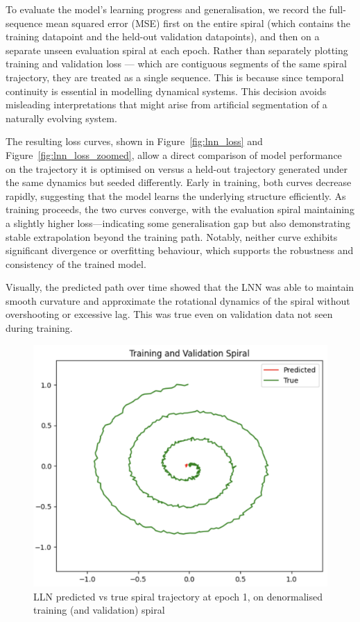To evaluate the model's learning progress and generalisation, we record the full-sequence mean squared error (MSE) first on the entire spiral (which contains the training datapoint and the held-out validation datapoints), and then on a separate unseen evaluation spiral at each epoch. Rather than separately plotting training and validation loss — which are contiguous segments of the same spiral trajectory, they are treated as a single sequence. This is because since temporal continuity is essential in modelling dynamical systems. This decision avoids misleading interpretations that might arise from artificial segmentation of a naturally evolving system.

The resulting loss curves, shown in Figure~\ref{fig:lnn_loss} and Figure~\ref{fig:lnn_loss_zoomed}, allow a direct comparison of model performance on the trajectory it is optimised on versus a held-out trajectory generated under the same dynamics but seeded differently. Early in training, both curves decrease rapidly, suggesting that the model learns the underlying structure efficiently. As training proceeds, the two curves converge, with the evaluation spiral maintaining a slightly higher loss—indicating some generalisation gap but also demonstrating stable extrapolation beyond the training path. Notably, neither curve exhibits significant divergence or overfitting behaviour, which supports the robustness and consistency of the trained model.

Visually, the predicted path over time showed that the LNN was able to maintain smooth curvature and approximate the rotational dynamics of the spiral without overshooting or excessive lag. This was true even on validation data not seen during training. 

\begin{figure}[H]
    \centering
    \includegraphics[width=0.8\linewidth]{img/lnn_training_validation_spiral_epoch_1.png}
    \caption{LLN predicted vs true spiral trajectory at epoch 1, on denormalised training (and validation) spiral}
    \label{fig:lnn_training_validation_spiral_epoch_1}
\end{figure}

